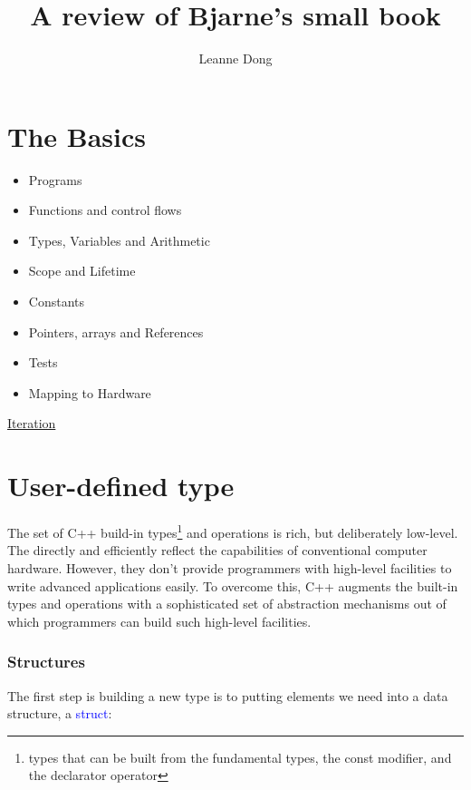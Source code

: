 \documentclass{article}
\title{A review of Bjarne's small book}
\author{Leanne Dong}
\newcommand{\be}[1]{\textcolor{blue}{#1}}
\begin{document}
	\maketitle
	\tableofcontents
\section{The Basics}
\begin{itemize}
	\item Programs
	\item Functions and control flows
	\item Types, Variables and Arithmetic
	\item Scope and Lifetime
	\item Constants
	\item Pointers, arrays and References
	\item Tests
	\item Mapping to Hardware
\end{itemize}

\href{https://gcc.godbolt.org/z/bah4zM}{Iteration}
\section{User-defined type}
The set of C++ build-in types\footnote{types that can be built from the fundamental types, the const modifier, and the declarator operator} and operations is rich, but deliberately low-level. The directly and efficiently reflect the capabilities of conventional computer hardware. However, they don't provide programmers with high-level facilities to write advanced applications easily. To overcome this, C++ augments the built-in types and operations with a sophisticated set of abstraction mechanisms out of which programmers can build such high-level facilities.

\subsubsection{Structures}

The first step is building a new type is to putting elements we need into a data structure, a \be{struct}:
\end{document}
